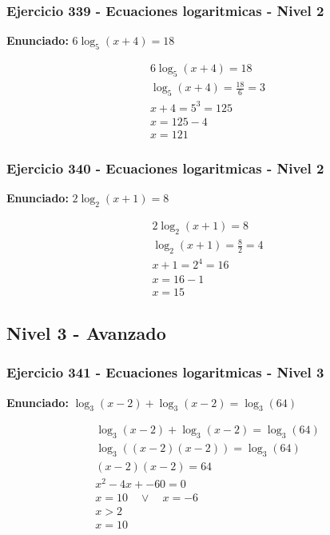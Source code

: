 \documentclass[12pt,a4paper]{article}
\begin{document}
\subsubsection*{Ejercicio 339 - Ecuaciones logaritmicas - Nivel 2}
\textbf{Enunciado:} \(6\log_{5}\left(x+4\right)=18\)

\[
\begin{aligned}
6\log_{5}\left(x+4\right)=18\\
\log_{5}\left(x+4\right)=\frac{18}{6}=3\\
x+4=5^{3}=125\\
x=125-4\\
\boxed{x=121}
\end{aligned}
\]


\subsubsection*{Ejercicio 340 - Ecuaciones logaritmicas - Nivel 2}
\textbf{Enunciado:} \(2\log_{2}\left(x+1\right)=8\)

\[
\begin{aligned}
2\log_{2}\left(x+1\right)=8\\
\log_{2}\left(x+1\right)=\frac{8}{2}=4\\
x+1=2^{4}=16\\
x=16-1\\
\boxed{x=15}
\end{aligned}
\]


\newpage

\subsection*{Nivel 3 - Avanzado}

\subsubsection*{Ejercicio 341 - Ecuaciones logaritmicas - Nivel 3}
\textbf{Enunciado:} \(\log_{3}\left(x-2\right)+\log_{3}\left(x-2\right)=\log_{3}\left(64\right)\)

\[
\begin{aligned}
\log_{3}\left(x-2\right)+\log_{3}\left(x-2\right)=\log_{3}\left(64\right)\\
\log_{3}\left((x-2)(x-2)\right)=\log_{3}\left(64\right)\\
(x-2)(x-2)=64\\
x^2-4x+-60=0\\
x=10\quad \vee\quad x=-6\\
x>2\\
\boxed{x=10}
\end{aligned}
\]
\end{document}
